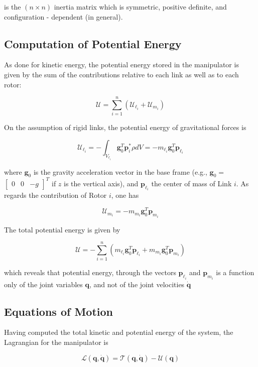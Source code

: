 \documentclass[10pt]{article}
\begin{document}
is the $(n \times n)$ inertia matrix which is  symmetric, positive definite, and configuration - dependent (in general).


\subsection{Computation of Potential Energy}
As done for kinetic energy, the potential energy stored in the manipulator is given by the sum of the contributions relative to each link as well as to each rotor:

$$
\mathcal{U}=\sum_{i=1}^{n}\left(\mathcal{U}_{\ell_{i}}+\mathcal{U}_{m_{i}}\right)
$$

On the assumption of rigid links, the potential energy of gravitational forces is

$$
\mathcal{U}_{\ell_{i}}=-\int_{V_{\ell_{i}}} \boldsymbol{g}_{0}^{T} \boldsymbol{p}_{i}^{*} \rho d V=-m_{\ell_{i}} \boldsymbol{g}_{0}^{T} \boldsymbol{p}_{\ell_{i}}
$$

where $\boldsymbol{g}_{0}$ is the gravity acceleration vector in the base frame (e.g., $\boldsymbol{g}_{0}=$ $\left[\begin{array}{lll}0 & 0 & -g\end{array}\right]^{T}$ if $z$ is the vertical axis), and $\boldsymbol{p}_{\ell_{i}}$ the center of mass of Link $i$. As regards the contribution of Rotor $i$, one has

$$
\mathcal{U}_{m_{i}}=-m_{m_{i}} \boldsymbol{g}_{0}^{T} \boldsymbol{p}_{m_{i}}
$$

The total potential energy is given by

$$
\mathcal{U}=-\sum_{i=1}^{n}\left(m_{\ell_{i}} \boldsymbol{g}_{0}^{T} \boldsymbol{p}_{\ell_{i}}+m_{m_{i}} \boldsymbol{g}_{0}^{T} \boldsymbol{p}_{m_{i}}\right)
$$

which reveals that potential energy, through the vectors $\boldsymbol{p}_{\ell_{i}}$ and $\boldsymbol{p}_{m_{i}}$ is a function only of the joint variables $\boldsymbol{q}$, and not of the joint velocities $\dot{\boldsymbol{q}}$

\subsection{Equations of Motion}
Having computed the total kinetic and potential energy of the system, the Lagrangian for the manipulator is

$$
\mathcal{L}(\boldsymbol{q}, \dot{\boldsymbol{q}})=\mathcal{T}(\boldsymbol{q}, \dot{\boldsymbol{q}})-\mathcal{U}(\boldsymbol{q})
$$
\end{document}
